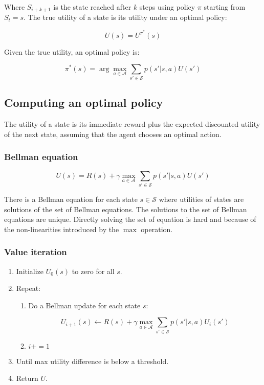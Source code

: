 			Where $S_{i+k+1}$ is the state reached after $k$ steps using policy $\pi$ starting from $S_t = s$.
			The true utility of a state is its utility under an optimal policy:

			$$U(s) = U^{\pi^*}(s)$$

			Given the true utility, an optimal policy is:

			$$\pi^*(s) = \arg\max\limits_{a\in\mathcal{A}}\sum\limits_{s'\in\mathcal{S}}p(s'|s,a)U(s')$$


	\subsection{Computing an optimal policy}
	The utility of a state is its immediate reward plus the expected discounted utility of the next state, assuming that the agent chooses an optimal action.

		\subsubsection{Bellman equation}

		$$U(s) = R(s) + \gamma\max\limits_{a\in\mathcal{A}}\sum\limits_{s'\in\mathcal{S}}p(s'|s,a)U(s')$$

		There is a Bellman equation for each state $s\in\mathcal{S}$ where utilities of states are solutions of the set of Bellman equations.
		The solutions to the set of Bellman equations are unique.
		Directly solving the set of equation is hard and because of the non-linearities introduced by the $\max$ operation.

		\subsubsection{Value iteration}

		\begin{enumerate}
			\item Initialize $U_0(s)$ to zero for all $s$.
			\item Repeat:

				\begin{enumerate}
					\item Do a Bellman update for each state $s$:

						$$U_{i+1}(s) \leftarrow R(s) + \gamma\max\limits_{a\in\mathcal{A}}\sum\limits_{s'\in\mathcal{S}}p(s'|s,a)U_i(s')$$

					\item $i += 1$
				\end{enumerate}

			\item Until max utility difference is below a threshold.
			\item Return $U$.
		\end{enumerate}

